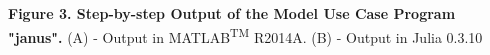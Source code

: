 \textbf{Figure 3. Step-by-step Output of the Model Use Case Program "janus".} (A) - Output in MATLAB\textsuperscript{TM} R2014A. (B) - Output in Julia 0.3.10
  
  
  
  
  